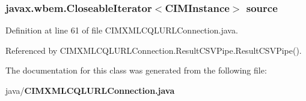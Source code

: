 \subsubsection[{source}]{\setlength{\rightskip}{0pt plus 5cm}javax.\+wbem.\+Closeable\+Iterator$<$C\+I\+M\+Instance$>$ source\hspace{0.3cm}{\ttfamily [protected]}}\label{classorg_1_1smallfoot_1_1parser_1_1cimcql_1_1CIMXMLCQLURLConnection_1_1ResultCSVPipe_aba69451974e3a12eee61d115c7a023d1}


Definition at line 61 of file C\+I\+M\+X\+M\+L\+C\+Q\+L\+U\+R\+L\+Connection.\+java.



Referenced by C\+I\+M\+X\+M\+L\+C\+Q\+L\+U\+R\+L\+Connection.\+Result\+C\+S\+V\+Pipe.\+Result\+C\+S\+V\+Pipe().



The documentation for this class was generated from the following file\+:\begin{DoxyCompactItemize}
\item 
java/{\bf C\+I\+M\+X\+M\+L\+C\+Q\+L\+U\+R\+L\+Connection.\+java}\end{DoxyCompactItemize}
